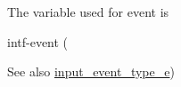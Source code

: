 The variable used for event is
\begin{DoxyItemize}
\item intf-\/event (\begin{DoxySeeAlso}{See also}
\hyperlink{vlc__input_8h_a4a3eb08df7f1209edd1edb4f0ed9242f}{input\+\_\+event\+\_\+type\+\_\+e}) 
\end{DoxySeeAlso}

\end{DoxyItemize}